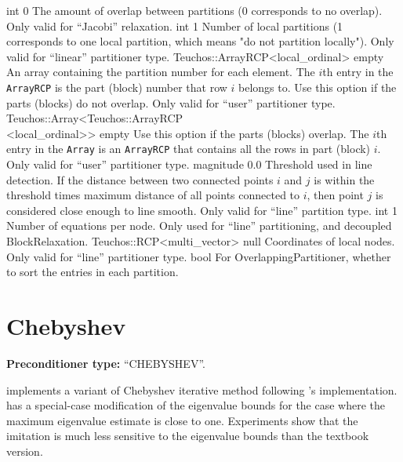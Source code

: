     {int}
    {0}
    {The amount of overlap between partitions (0 corresponds to no overlap).
     Only valid for ``Jacobi'' relaxation.}
    {int}
    {1}
    {Number of local partitions (1 corresponds to one local partition, which
     means "do not partition locally"). Only valid for ``linear'' partitioner
     type.}
    {Teuchos::ArrayRCP<local\_ordinal>}
    {empty}
    {An array containing the partition number for each element.
     The $i$th entry in the \texttt{ArrayRCP} is the part (block) number that
     row $i$ belongs to. Use this option if the parts (blocks) do not
     overlap. Only valid for ``user'' partitioner type.}
    {Teuchos::Array<Teuchos::ArrayRCP\\<local\_ordinal>>}
    {empty}
    {Use this option if the parts (blocks) overlap. The $i$th entry in the
     \texttt{Array} is an \texttt{ArrayRCP} that contains all the rows in part
     (block) $i$. Only valid for ``user'' partitioner type.}
    {magnitude}
    {0.0}
    {Threshold used in line detection. If the distance between two connected
     points $i$ and $j$ is within the threshold times maximum distance of all
     points connected to $i$, then point $j$ is considered close enough to line
     smooth. Only valid for ``line'' partition type.}
    {int}
    {1}
    {Number of equations per node. Only used for ``line'' partitioning, and
     decoupled BlockRelaxation.}
    {Teuchos::RCP<multi\_vector>}
    {null}
    {Coordinates of local nodes. Only valid for ``line'' partitioner type.}
    {bool}
    {\false}
    {For OverlappingPartitioner, whether to sort the entries in each partition.}

\section{Chebyshev}\label{s:Chebyshev}

\textbf{Preconditioner type:} ``CHEBYSHEV''.


\ifpacktwo{} implements a variant of Chebyshev iterative method following
\ifpack{}'s implementation.  \ifpack{} has a special-case modification of the
eigenvalue bounds for the case where the maximum eigenvalue estimate is close to
one. Experiments show that the \ifpack{} imitation is much less sensitive to the
eigenvalue bounds than the textbook version.

